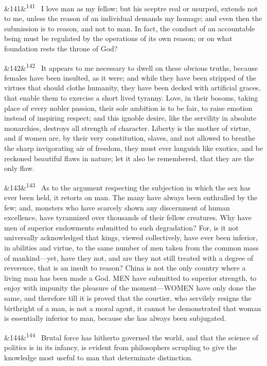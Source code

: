 \documentclass[12pt]{article}
\newcommand{\para}[1][]{\par\noindent\ifx&#1&\else\textsuperscript{\footnotesize #1}~\fi}
\begin{document}
\para[141] I love man as my fellow; but his sceptre real or usurped, extends not to me, unless the reason of an individual demands my homage; and even then the submission is to reason, and not to man. In fact, the conduct of an accountable being must be regulated by the operations of its own reason; or on what foundation rests the throne of God?

\para[142] It appears to me necessary to dwell on these obvious truths, because females have been insulted, as it were; and while they have been stripped of the virtues that should clothe humanity, they have been decked with artificial graces, that enable them to exercise a short lived tyranny. Love, in their bosoms, taking place of every nobler passion, their sole ambition is to be fair, to raise emotion instead of inspiring respect; and this ignoble desire, like the servility in absolute monarchies, destroys all strength of character. Liberty is the mother of virtue, and if women are, by their very constitution, slaves, and not allowed to breathe the sharp invigorating air of freedom, they must ever languish like exotics, and be reckoned beautiful flaws in nature; let it also be remembered, that they are the only flaw.

\para[143] As to the argument respecting the subjection in which the sex has ever been held, it retorts on man. The many have always been enthralled by the few; and, monsters who have scarcely shown any discernment of human excellence, have tyrannized over thousands of their fellow creatures. Why have men of superior endowments submitted to such degradation? For, is it not universally acknowledged that kings, viewed collectively, have ever been inferior, in abilities and virtue, to the same number of men taken from the common mass of mankind---yet, have they not, and are they not still treated with a degree of reverence, that is an insult to reason? China is not the only country where a living man has been made a God. MEN have submitted to superior strength, to enjoy with impunity the pleasure of the moment---WOMEN have only done the same, and therefore till it is proved that the courtier, who servilely resigns the birthright of a man, is not a moral agent, it cannot be demonstrated that woman is essentially inferior to man, because she has always been subjugated.

\para[144] Brutal force has hitherto governed the world, and that the science of politics is in its infancy, is evident from philosophers scrupling to give the knowledge most useful to man that determinate distinction.
\end{document}
